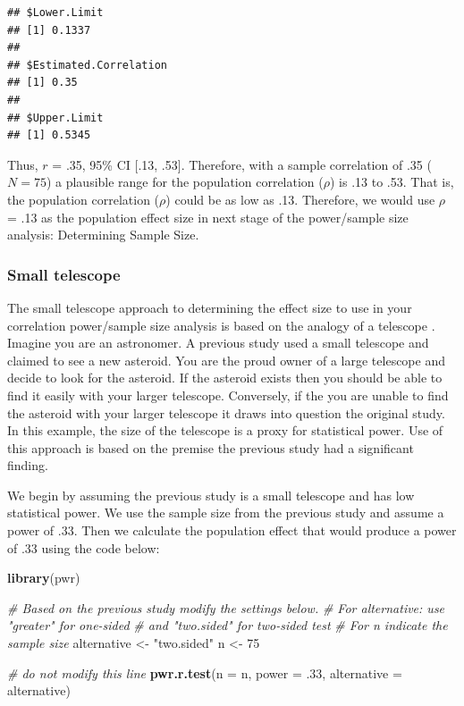 \documentclass[
]{krantz}
\makeatletter
\newenvironment{Shaded}{\begin{snugshade}}{\end{snugshade}}
\newcommand{\CommentTok}[1]{\textcolor[rgb]{0.37,0.37,0.37}{\textit{#1}}}
\newcommand{\DataTypeTok}[1]{\textcolor[rgb]{0.27,0.27,0.27}{#1}}
\newcommand{\DecValTok}[1]{\textcolor[rgb]{0.06,0.06,0.06}{#1}}
\newcommand{\FloatTok}[1]{\textcolor[rgb]{0.06,0.06,0.06}{#1}}
\newcommand{\KeywordTok}[1]{\textcolor[rgb]{0.27,0.27,0.27}{\textbf{#1}}}
\newcommand{\NormalTok}[1]{#1}
\newcommand{\StringTok}[1]{\textcolor[rgb]{0.5,0.5,0.5}{#1}}
\newenvironment{kframe}{%
\medskip{}
\setlength{\fboxsep}{.8em}
 \def\at@end@of@kframe{}%
 \ifinner\ifhmode%
  \def\at@end@of@kframe{\end{minipage}}%
  \begin{minipage}{\columnwidth}%
 \fi\fi%
 \def\FrameCommand##1{\hskip\@totalleftmargin \hskip-\fboxsep
 \colorbox{shadecolor}{##1}\hskip-\fboxsep
     \hskip-\linewidth \hskip-\@totalleftmargin \hskip\columnwidth}%
 \MakeFramed {\advance\hsize-\width
   \@totalleftmargin\z@ \linewidth\hsize
   \@setminipage}}%
 {\par\unskip\endMakeFramed%
 \at@end@of@kframe}
\renewenvironment{Shaded}{\begin{kframe}}{\end{kframe}}
\makeatother
\begin{document}
\begin{verbatim}
## $Lower.Limit
## [1] 0.1337
## 
## $Estimated.Correlation
## [1] 0.35
## 
## $Upper.Limit
## [1] 0.5345
\end{verbatim}

Thus, \(r\) = .35, 95\% CI {[}.13, .53{]}. Therefore, with a sample correlation of .35 (\(N=75\)) a plausible range for the population correlation (\(\rho\)) is .13 to .53. That is, the population correlation (\(\rho\)) could be as low as .13. Therefore, we would use \(\rho\) = .13 as the population effect size in next stage of the power/sample size analysis: Determining Sample Size.

\hypertarget{small-telescope-2}{%
\subsubsection{Small telescope}\label{small-telescope-2}}

The small telescope approach to determining the effect size to use in your correlation power/sample size analysis is based on the analogy of a telescope \citep{simonsohn2015small}. Imagine you are an astronomer. A previous study used a small telescope and claimed to see a new asteroid. You are the proud owner of a large telescope and decide to look for the asteroid. If the asteroid exists then you should be able to find it easily with your larger telescope. Conversely, if the you are unable to find the asteroid with your larger telescope it draws into question the original study. In this example, the size of the telescope is a proxy for statistical power. Use of this approach is based on the premise the previous study had a significant finding.

We begin by assuming the previous study is a small telescope and has low statistical power. We use the sample size from the previous study and assume a power of .33. Then we calculate the population effect that would produce a power of .33 using the code below:

\begin{Shaded}
\begin{Highlighting}[]
\KeywordTok{library}\NormalTok{(pwr)}

\CommentTok{# Based on the previous study modify the settings below.}
\CommentTok{# For alternative: use "greater" for one-sided }
\CommentTok{# and "two.sided" for two-sided test}
\CommentTok{# For n indicate the sample size}
\NormalTok{alternative <-}\StringTok{ "two.sided"}
\NormalTok{n <-}\StringTok{ }\DecValTok{75}

\CommentTok{# do not modify this line}
\KeywordTok{pwr.r.test}\NormalTok{(}\DataTypeTok{n =}\NormalTok{ n,}
           \DataTypeTok{power =} \FloatTok{.33}\NormalTok{, }
           \DataTypeTok{alternative =}\NormalTok{ alternative)}
\end{Highlighting}
\end{Shaded}
\end{document}

